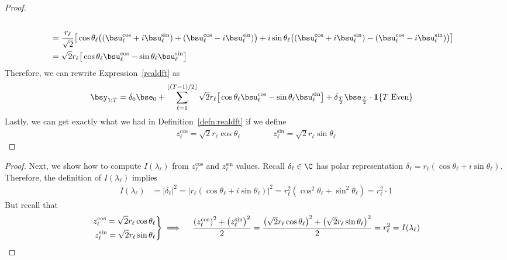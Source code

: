 \documentclass[12pt]{article}
\theoremstyle{plain}
\theoremstyle{definition}
\theoremstyle{remark}
\newenvironment{rcases}
  {\left.\begin{aligned}}
  {\end{aligned}\right\rbrace}
\begin{document}
\begin{proof}
\begin{align*}
  \\
  &=
  \frac{r_\ell}{\sqrt{2}}
  \big[
  \cos \theta_\ell
  \big(
  (\bsu_\ell^{\cos} + i \bsu_\ell^{\sin})
  + (\bsu_\ell^{\cos} - i \bsu_\ell^{\sin})
  \big)
  +
  i\sin \theta_\ell
  \big(
  (\bsu_\ell^{\cos} + i \bsu_\ell^{\sin})
  -
  (\bsu_\ell^{\cos} - i \bsu_\ell^{\sin})
  \big)
  \big]
  \\
  &=
  \sqrt{2}r_\ell
  \big[
  \cos \theta_\ell
  \bsu_\ell^{\cos}
  -
  \sin \theta_\ell
  \bsu_\ell^{\sin}
  \big]
\end{align*}
Therefore, we can rewrite Expression~\ref{realdft} as
\begin{align}
  \bsy_{1:T}
  &=
  \delta_0 \bse_0
  +
  \sum_{\ell=1}^{\left\lfloor (T-1)/2 \right\rfloor}
  \sqrt{2}r_\ell
  \big[
  \cos \theta_\ell
  \bsu_\ell^{\cos}
  -
  \sin \theta_\ell
  \bsu_\ell^{\sin}
  \big]
  + \delta_{\frac{T}{2}}\bse_{\frac{T}{2}}
    \cdot\mathbf{1}\{\text{$T$ Even}\}
    \notag
\end{align}
Lastly, we can get exactly what we had in Definition~\ref{defn:realdft}
if we define
\begin{align*}
  z_\ell^{\cos} = \sqrt{2}r_\ell\cos\theta_\ell
  \qquad\qquad
  z_\ell^{\sin} = \sqrt{2}r_\ell\sin\theta_\ell
\end{align*}
\end{proof}

\begin{proof}
Next, we show how to compute $I(\lambda_\ell)$ from $z_\ell^{\cos}$ and
$z_\ell^{\sin}$ values. Recall $\delta_\ell\in\C$ has polar
representation $\delta_\ell=r_\ell(\cos\theta_\ell+i\sin \theta_\ell)$.
Therefore, the definition of $I(\lambda_\ell)$ implies
\begin{align*}
  I(\lambda_\ell)
  &= |\delta_\ell|^2
  = |r_\ell (\cos\theta_\ell+i\sin\theta_\ell)|^2
  = r_\ell^2 (\cos^2\theta_\ell+\sin^2\theta_\ell)
  = r_\ell^2 \cdot 1
\end{align*}
But recall that
\begin{align*}
  \begin{rcases}
  z_\ell^{\cos} = \sqrt{2}r_\ell\cos\theta_\ell
  \\
  z_\ell^{\sin} = \sqrt{2}r_\ell\sin\theta_\ell
  \end{rcases}
  \implies\quad
  \frac{\left(z_\ell^{\cos}\right)^2 + \left(z_\ell^{\sin}\right)^2}{2}
  =
  \frac{%
    \left(\sqrt{2}r_\ell\cos\theta_\ell\right)^2
    +
    \left(\sqrt{2}r_\ell\sin\theta_\ell\right)^2
  }{2}
  = r_\ell^2
  = I(\lambda_\ell)
\end{align*}
\end{proof}
\end{document}
